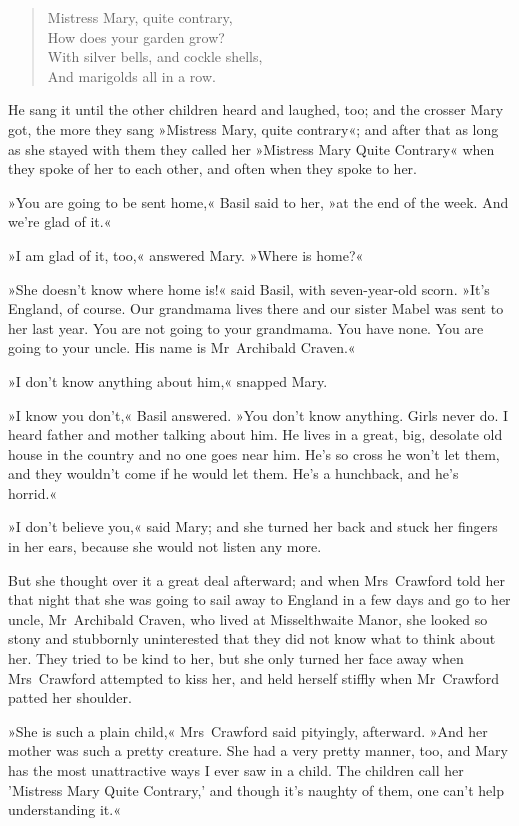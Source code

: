 \begin{verse}
Mistress Mary, quite contrary,\\
How does your garden grow?\\
With silver bells, and cockle shells,\\
And marigolds all in a row.
\end{verse}


He sang it until the other children heard and laughed, too; and the crosser Mary got, the more they sang »Mistress Mary, quite contrary«; and after that as long as she stayed with them they called her »Mistress Mary Quite Contrary« when they spoke of her to each other, and often when they spoke to her.

»You are going to be sent home,« Basil said to her, »at the end of the week. And we're glad of it.«

»I am glad of it, too,« answered Mary. »Where is home?«

»She doesn't know where home is!« said Basil, with seven-year-old scorn. »It's England, of course. Our grandmama lives there and our sister Mabel was sent to her last year. You are not going to your grandmama. You have none. You are going to your uncle. His name is Mr~Archibald Craven.«

»I don't know anything about him,« snapped Mary.

»I know you don't,« Basil answered. »You don't know anything. Girls never do. I heard father and mother talking about him. He lives in a great, big, desolate old house in the country and no one goes near him. He's so cross he won't let them, and they wouldn't come if he would let them. He's a hunchback, and he's horrid.«

»I don't believe you,« said Mary; and she turned her back and stuck her fingers in her ears, because she would not listen any more.

But she thought over it a great deal afterward; and when Mrs~Crawford told her that night that she was going to sail away to England in a few days and go to her uncle, Mr~Archibald Craven, who lived at Misselthwaite Manor, she looked so stony and stubbornly uninterested that they did not know what to think about her. They tried to be kind to her, but she only turned her face away when Mrs~Crawford attempted to kiss her, and held herself stiffly when Mr~Crawford patted her shoulder.

»She is such a plain child,« Mrs~Crawford said pityingly, afterward. »And her mother was such a pretty creature. She had a very pretty manner, too, and Mary has the most unattractive ways I ever saw in a child. The children call her 'Mistress Mary Quite Contrary,' and though it's naughty of them, one can't help understanding it.«

